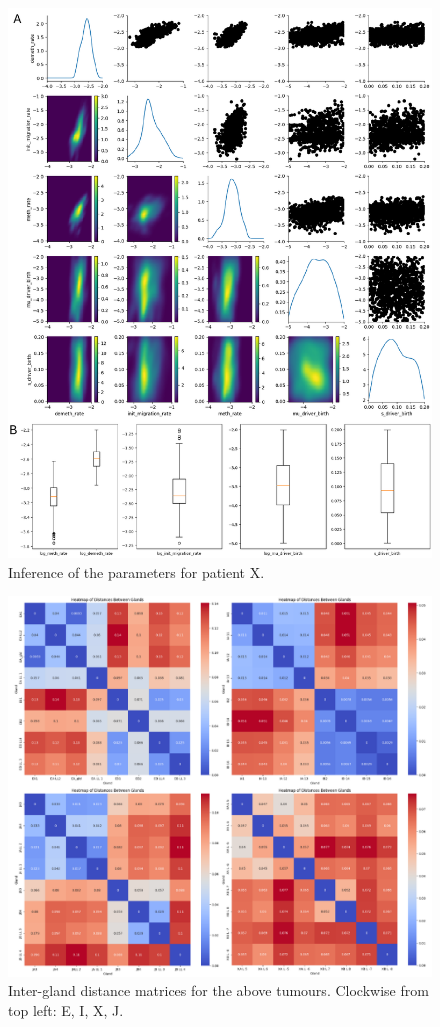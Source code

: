 \begin{figure}[h]
\centering
\includegraphics[width=\textwidth]{Chapter_5/figures/inference_X.pdf}
\caption{Inference of the parameters for patient X.}
\label{fig:inference_X}
\end{figure}

\begin{figure}[ht]
\centering
\includegraphics[width=\textwidth]{Chapter_5/figures/gland_dists.pdf}
\caption{Inter-gland distance matrices for the above tumours. Clockwise from
    top left: E, I, X, J.}
\label{fig:gland_dists}
\end{figure}
